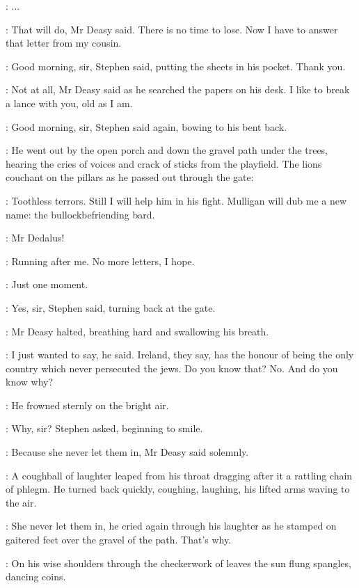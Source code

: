 \Stephen:
 ...

\deasy:
That will do, Mr Deasy said. There is no time to lose. Now I have to
answer that letter from my cousin.

\Stephen:
Good morning, sir, Stephen said, putting the sheets in his pocket.
Thank you.

\deasy:
Not at all, Mr Deasy said as he searched the papers on his desk. I like
to break a lance with you, old as I am.

\Stephen:
Good morning, sir, Stephen said again, bowing to his bent back.

:
He went out by the open porch and down the gravel path under the
trees, hearing the cries of voices and crack of sticks from the playfield.
The lions couchant on the pillars as he passed out through the gate:

\StephenInt:
Toothless terrors. Still I will help him in his fight. Mulligan will dub
me a new name: the bullockbefriending bard.

\deasy:
Mr Dedalus!

\StephenInt:
Running after me. No more letters, I hope.

\deasy:
Just one moment.

\Stephen:
Yes, sir, Stephen said, turning back at the gate.

:
Mr Deasy halted, breathing hard and swallowing his breath.

\deasy:
I just wanted to say, he said. Ireland, they say, has the honour of
being the only country which never persecuted the jews. Do you know that?
No. And do you know why?

:
He frowned sternly on the bright air.

\Stephen:
Why, sir? Stephen asked, beginning to smile.

\deasy:
Because she never let them in, Mr Deasy said solemnly.

:
A coughball of laughter leaped from his throat dragging after it a
rattling chain of phlegm. He turned back quickly, coughing, laughing, his
lifted arms waving to the air.

\deasy:
She never let them in, he cried again through his laughter as he
stamped on gaitered feet over the gravel of the path. That's why.

:
On his wise shoulders through the checkerwork of leaves the sun flung
spangles, dancing coins.



